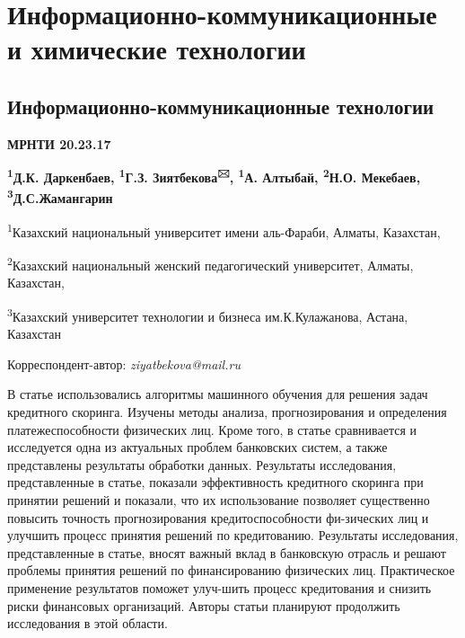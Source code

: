 \let\cleardoublepage\clearpage
\part{Информационно-коммуникационные и химические технологии}
\chapter{Информационно-коммуникационные технологии}
{\bfseries МРНТИ 20.23.17}



\begin{center}
{\bfseries \textsuperscript{1}Д.К. Даркенбаев, \textsuperscript{1}Г.З.
Зиятбекова\textsuperscript{🖂}, \textsuperscript{1}А. Алтыбай,
\textsuperscript{2}Н.О. Мекебаев, \textsuperscript{3}Д.С.Жамангарин}

\textsuperscript{1}Казахский национальный университет имени аль-Фараби,
Алматы, Казахстан,

\textsuperscript{2}Казахский национальный женский педагогический
университет, Алматы, Казахстан,

\textsuperscript{3}Казахский университет технологии и бизнеса им.К.Кулажанова, Астана,
Казахстан
\end{center}
Корреспондент-автор: \emph{ziyatbekova@mail.ru} \vspace{0.5cm}

В статье использовались алгоритмы машинного обучения для решения задач
кредитного скоринга. Изучены методы анализа, прогнозирования и
определения платежеспособности физических лиц. Кроме того, в статье
сравнивается и исследуется одна из актуальных проблем банковских систем,
а также представлены результаты обработки данных. Результаты
исследования, представленные в статье, показали эффективность кредитного
скоринга при принятии решений и показали, что их использование позволяет
существенно повысить точность прогнозирования кредитоспособности
фи-зических лиц и улучшить процесс принятия решений по кредитованию.
Результаты исследования, представленные в статье, вносят важный вклад в
банковскую отрасль и решают проблемы принятия решений по финансированию
физических лиц. Практическое применение результатов поможет улуч-шить
процесс кредитования и снизить риски финансовых организаций. Авторы
статьи планируют продолжить исследования в этой области.

